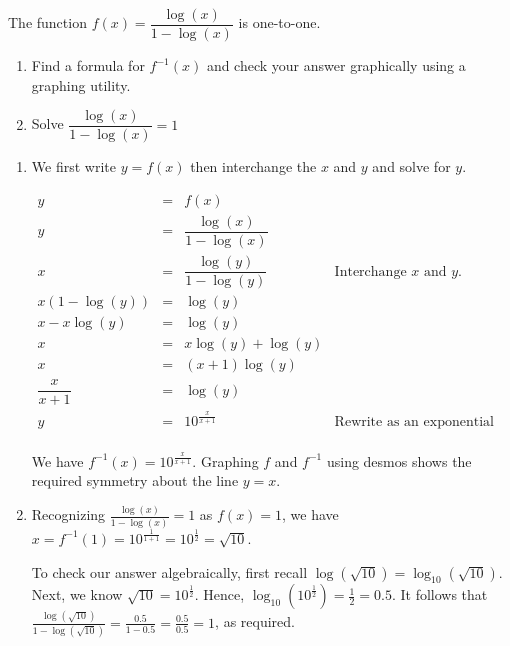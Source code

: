 \documentclass{ximera}
\begin{document}
\begin{example}  \label{logfracinverse} The function $f(x) = \dfrac{\log(x)}{1-\log(x)}$ is one-to-one. 

\begin{enumerate}

\item  Find a formula for $f^{-1}(x)$ and check your answer graphically using a graphing utility.

\item Solve  $\dfrac{\log(x)}{1-\log(x)} = 1$

\end{enumerate}

\begin{explanation} \begin{enumerate} \item  We first write $y=f(x)$ then interchange the $x$ and $y$ and solve for $y$.

\[ \begin{array}{rclr}
y & = & f(x) & \\ 
y  & = & \dfrac{\log(x)}{1-\log(x)} & \\ 
x  & = & \dfrac{\log(y)}{1-\log(y)} & \text{Interchange $x$ and $y$.}\\ 
x\left(1-\log(y)\right) & = & \log(y) & \\ 
x - x\log(y)  & = & \log(y) & \\ 
x & = & x \log(y) + \log(y) & \\ 
x & = & (x+1) \log(y) & \\ 
\dfrac{x}{x+1}  & = & \log(y) & \\ 
y & = & 10^{\frac{x}{x+1}} & \text{Rewrite as an exponential equation.}\\

\end{array}\]



We have $f^{-1}(x) = 10^{\frac{x}{x+1}}$.  Graphing $f$ and $f^{-1}$ using desmos shows the required symmetry about the line $y=x$.

\begin{center}
\end{center}

\item Recognizing   $\frac{\log(x)}{1-\log(x)} = 1$ as $f(x) = 1$, we have $x = f^{-1}(1) = 10^{\frac{1}{1+1}} = 10^{\frac{1}{2}} = \sqrt{10}$.

To check our answer algebraically,  first recall  $\log(\sqrt{10}) = \log_{10}(\sqrt{10})$.  Next, we know $\sqrt{10} = 10^{\frac{1}{2}}$.  Hence, $\log_{10} \left(10^{\frac{1}{2}} \right) = \frac{1}{2} = 0.5$.  It follows that $\frac{\log(\sqrt{10})}{1-\log(\sqrt{10})} = \frac{0.5}{1-0.5} = \frac{0.5}{0.5} = 1$, as required.  

\end{enumerate}
\end{explanation}

\end{example}
\end{document}
